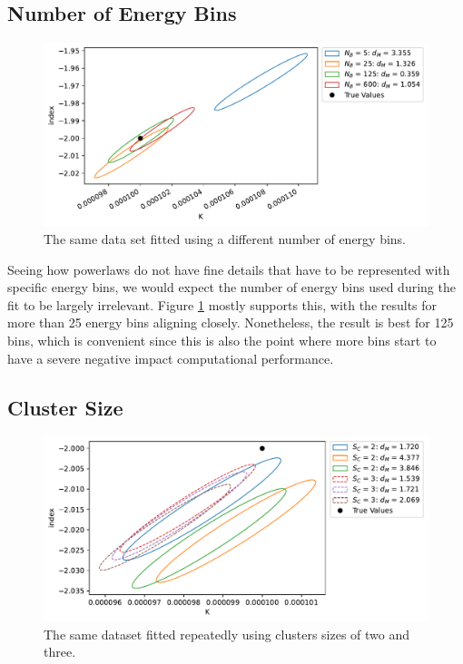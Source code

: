 \documentclass{article}
\begin{document}
\FloatBarrier

\subsection{Number of Energy Bins}

\begin{figure}[h]
    \centering
    \includegraphics[width=\textwidth]{Images/num_e_bins.pdf}
    \caption{The same data set fitted using a different number of energy bins.}
    \label{fig num bins}
\end{figure}

Seeing how powerlaws do not have fine details that have to be represented with specific energy bins, we would expect the number of energy bins used during the fit to be largely irrelevant. Figure \ref{fig num bins} mostly supports this, with the results for more than 25 energy bins aligning closely. Nonetheless, the result is best for 125 bins, which is convenient since this is also the point where more bins start to have a severe negative impact computational performance.

\FloatBarrier

\subsection{Cluster Size}

\begin{figure}[h]
    \centering
    \includegraphics[width=\textwidth]{Images/cluster_sizes.pdf}
    \caption{The same dataset fitted repeatedly using clusters sizes of two and three.}
    \label{fig cluster size}
\end{figure}
\end{document}
